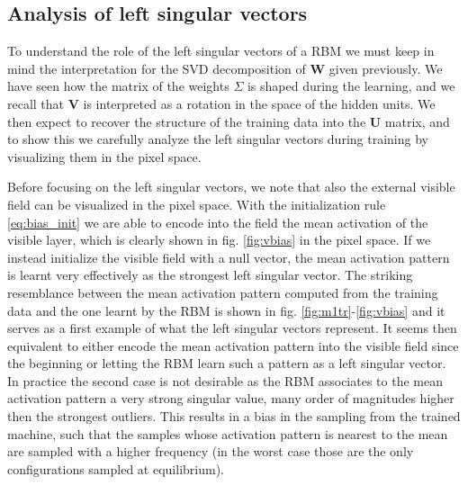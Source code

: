 \documentclass{revtex4-1}
\begin{document}
\subsection{Analysis of left singular vectors}

To understand the role of the left singular vectors of a RBM we must keep in mind the interpretation for the SVD decomposition of \textbf{W} given previously. We have seen how the matrix of the weights \textbf{\(\Sigma\)} is shaped during the learning, and we recall that \textbf{V} is interpreted as a rotation in the space of the hidden units. We then expect to recover the structure of the training data into the \textbf{U} matrix, and to show this we carefully analyze the left singular vectors during training by visualizing them in the pixel space.

Before focusing on the left singular vectors, we note that also the external visible field can be visualized in the pixel space. With the initialization rule \eqref{eq:bias_init} we are able to encode into the field the mean activation of the visible layer, which is clearly shown in fig. \ref{fig:vbias} in the pixel space. If we instead initialize the visible field with a null vector, the mean activation pattern is learnt very effectively as the strongest left singular vector. The striking resemblance between the mean activation pattern computed from the training data and the one learnt by the RBM is shown in fig. \ref{fig:m1tr}-\ref{fig:vbias} and it serves as a first example of what the left singular vectors represent. It seems then equivalent to either encode the mean activation pattern into the visible field since the beginning or letting the RBM learn such a pattern as a left singular vector. In practice the second case is not desirable as the RBM associates to the mean activation pattern a very strong singular value, many order of magnitudes higher then the strongest outliers. This results in a bias in the sampling from the trained machine, such that the samples whose activation pattern is nearest to the mean are sampled with a higher frequency (in the worst case those are the only configurations sampled at equilibrium).
\end{document}
